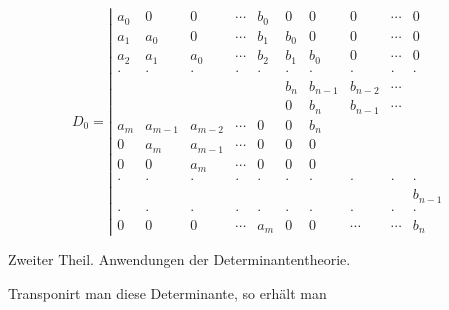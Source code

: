\documentclass[11pt]{article}
\providecommand{\weberpage}[1]{}
\begin{document}
\[
D_0 = \left|
\begin{array}{cccccccccc}
a_0 & 0 & 0 & \cdots & b_0 & 0 & 0 & 0 & \cdots & 0\\
a_1 & a_0 & 0 & \cdots & b_1 & b_0 & 0 & 0 & \cdots & 0\\
a_2 & a_1 & a_0 & \cdots & b_2 & b_1 & b_0 & 0 & \cdots & 0\\
\cdot & \cdot & \cdot & \cdot & \cdot & \cdot & \cdot & \cdot & \cdot & \cdot\\
 & & & & & b_n & b_{n-1} & b_{n-2} & \cdots & \\
 & & & & & 0 & b_n & b_{n-1} & \cdots & \\
a_m & a_{m-1} & a_{m-2} & \cdots & 0 & 0 & b_n & & & \\
0 & a_m & a_{m-1} & \cdots & 0 & 0 & 0 & & & \\
0 & 0 & a_m & \cdots & 0 & 0 & 0 & & & \\
\cdot & \cdot & \cdot & \cdot & \cdot & \cdot & \cdot & \cdot & \cdot & \cdot\\
 & & & & & & & & & b_{n-1}\\
\cdot & \cdot & \cdot & \cdot & \cdot & \cdot & \cdot & \cdot & \cdot & \cdot\\
0 & 0 & 0 & \cdots & a_m & 0 & 0 & \cdots & \cdots & b_n
\end{array}
\right.
\]


\weberpage{138}
Zweiter Theil. Anwendungen der Determinantentheorie.

Transponirt man diese Determinante, so erhält man
\end{document}
